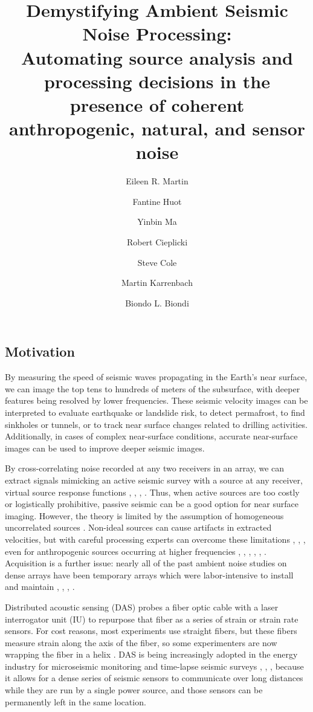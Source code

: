 \documentclass[11pt]{article}
\title{\vspace{-1.8cm} \Large Demystifying Ambient Seismic Noise Processing: \\Automating source analysis and processing decisions in the presence of coherent anthropogenic, natural, and sensor noise \vspace{-0.5cm}}
\author[1,2]{\small Eileen R. Martin}
\author[2]{Fantine Huot}
\author[1]{Yinbin Ma}
\author[2]{Robert Cieplicki}
\author[3]{Steve Cole}
\author[3]{Martin Karrenbach}
\author[1,2]{Biondo L. Biondi \vspace{-0.4cm}}
\affil[1]{Institute for Computational and Mathematical Engineering, Stanford University, Stanford, CA}
\affil[2]{Department of Geophysics, Stanford University, Stanford, CA}
\affil[3]{OptaSense, Brea, CA}
\date{}
\begin{document}
\maketitle

\vspace{-1.8cm}
\subsection*{Motivation} 
\vspace{-0.2cm}
By measuring the speed of seismic waves propagating in the Earth's near surface, we can image the top tens to hundreds of meters of the subsurface, with deeper features being resolved by lower frequencies. These seismic velocity images can be interpreted to evaluate earthquake or landslide risk, to detect permafrost, to find sinkholes or tunnels, or to track near surface changes related to drilling activities. Additionally, in cases of complex near-surface conditions, accurate near-surface images can be used to improve deeper seismic images.
\par
By cross-correlating noise recorded at any two receivers in an array, we can extract signals mimicking an active seismic survey with a source at any receiver, virtual source response functions \cite{Lobkis2001}, \cite{Lin2008}, \cite{Wapenaar2010A}, \cite{Wapenaar2010B}. Thus, when active sources are too costly or logistically prohibitive, passive seismic can be a good option for near surface imaging. However, the theory is limited by the assumption of homogeneous uncorrelated sources \cite{Wapenaar2010A}. Non-ideal sources can cause artifacts in extracted velocities, but with careful processing experts can overcome these limitations \cite{Bensen2007}, \cite{Daskalakis2016}, \cite{Zhan2013}, even for anthropogenic sources occurring at higher frequencies \cite{Girard2016}, \cite{Martin2015}, \cite{Martin2016}, \cite{Nakata2011}, \cite{Nakata2015}, \cite{Zeng2017}. Acquisition is a further issue: nearly all of the past ambient noise studies on dense arrays have been temporary arrays which were labor-intensive to install and maintain \cite{Lin2008}, \cite{Nakata2011}, \cite{Nakata2015}, \cite{Zeng2017}. 
\par
Distributed acoustic sensing (DAS) probes a fiber optic cable with a laser interrogator unit (IU) to repurpose that fiber as a series of strain or strain rate sensors. For cost reasons, most experiments use straight fibers, but these fibers measure strain along the axis of the fiber, so some experimenters are now wrapping the fiber in a helix \cite{Kuvshinov2016}. DAS is being increasingly adopted in the energy industry for microseismic monitoring \cite{Webster2013} and time-lapse seismic surveys \cite{Daley2013}, \cite{Mateeva2014}, \cite{Bakku2015}, \cite{Miller2016} because it allows for a dense series of seismic sensors to communicate over long distances while they are run by a single power source, and those sensors can be permanently left in the same location.
\end{document}
